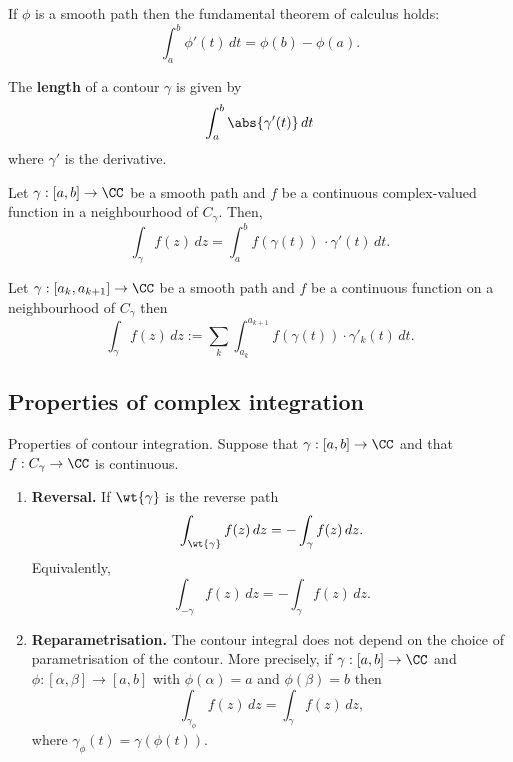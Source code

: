 \documentclass[12pt, a4paper]{article}
\begin{document}
\begin{lemma}
    If \(\phi\) is a smooth path then the fundamental theorem of calculus holds:
    \[\int_{a}^{b} \phi'(t) \, dt = \phi(b)-\phi(a).\]
\end{lemma}

\begin{definition}
    The \textbf{length} of a contour \(\gamma\) is given by 
    \[\int_{a}^{b} \abs{\gamma'(t)} \,dt\] 
    where \(\gamma'\) is the derivative.
\end{definition}

\begin{definition}
    Let \(\gamma:[a,b] \to \CC\) be a smooth path and \(f\) be a continuous complex-valued function in a neighbourhood of \(C_{\gamma}\). Then,
    \[\int_{\gamma} f(z) \, dz = \int_{a}^{b} f(\gamma(t)) \, \cdot \gamma'(t) \, dt.\]
\end{definition}

\begin{definition}
    Let \(\gamma:[a_k,a_{k+1}] \to \CC\) be a smooth path and \(f\) be a continuous function on a neighbourhood of \(C_{\gamma}\) then 
    \[\int_{\gamma} f(z) \, dz := \sum_k \int_{a_k}^{a_{k+1}} f(\gamma(t)) \cdot \gamma'_k(t) \, dt.\]
\end{definition}

\subsection{Properties of complex integration}

\begin{proposition}
    Properties of contour integration. Suppose that \(\gamma:[a,b] \to \CC\) and that \(f:C_{\gamma} \to \CC\) is continuous.
    \begin{enumerate}
        \item \textbf{Reversal.} If \(\wt{\gamma}\) is the reverse path 
        \[\int_{\wt{\gamma}} f(z) \, dz = -\int_{\gamma} f(z) \, dz.\]
        Equivalently,
        \[\int_{-\gamma} f(z) \, dz = -\int_{\gamma} f(z) \, dz.\]
        \item \textbf{Reparametrisation.} The contour integral does not depend on the choice of parametrisation of the contour. More precisely, if \(\gamma:[a,b] \to \CC\) and \(\phi:[\alpha,\beta] \to [a,b]\) with \(\phi(\alpha)=a\) and \(\phi(\beta)=b\) then 
        \[\int_{\gamma_{\phi}} f(z) \, dz = \int_{\gamma} f(z) \, dz,\]
        where \(\gamma_{\phi}(t) = \gamma(\phi(t))\).
    \end{enumerate}
\end{proposition}
\end{document}
